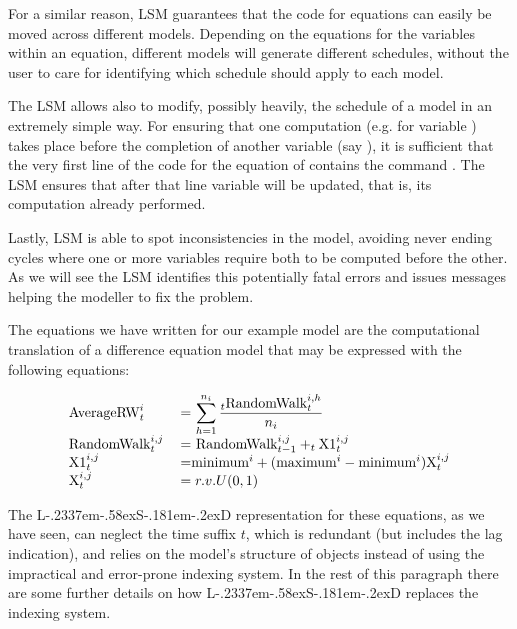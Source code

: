 \documentclass [11pt,a4paper] {book}
\def\LsD{{L\kern-.2337em\lower-.58ex\hbox{S}\kern-.181em\lower-.2ex\hbox{D}}\xspace}
\begin{document}
For a similar reason, LSM guarantees that the code for equations can easily be moved across different models. Depending on the equations for the variables within an equation, different models will generate different schedules, without the user to care for identifying which schedule should apply to each model.

The LSM allows also to modify, possibly heavily, the schedule of a model in an extremely simple way. For ensuring that one computation (e.g. for variable ) takes place before the completion of another variable (say ), it is sufficient that the very first line of the code for the equation of  contains the command . The LSM ensures that after that line variable  will be updated, that is, its computation already performed.

Lastly, LSM is able to spot inconsistencies in the model, avoiding never ending cycles where one or more variables require both to be computed before the other. As we will see the LSM identifies this potentially fatal errors and issues messages helping the modeller to fix the problem.


The equations we have written for our example model are the computational translation of a difference equation model that may be expressed with the following equations:

\begin{equation}
\begin{tabular}{ll}

$ \textnormal{AverageRW}_{t}^i$ & = $\displaystyle \sum_{h=1}^{n_i} \frac{_{t}\textnormal{RandomWalk}_t^{i,h}} {n_i} $\\
$ \textnormal{RandomWalk}_t^{i,j}$ & = $\textnormal{RandomWalk}_{t-1}^{i,j} + _{t}\textnormal{X1}_{t}^{i,j}$ \\
$\textnormal{X1}_t^{i,j} $& =$ \textnormal{minimum}^{i}+(\textnormal{maximum}^{i}-\textnormal{minimum}^{i})\textnormal{X}_{t}^{i,j} $\\
$ \textnormal{X}_{t}^{i,j} $& $ = r.v. U(0,1) $ \\
\end{tabular}
\end{equation}



The \LsD representation for these equations, as we have seen, can neglect the time suffix $t$, which is redundant (but includes the lag indication), and relies on the model's structure of objects instead of
using the impractical and error-prone indexing system. In the rest of this paragraph
there are some further details on how \LsD replaces the indexing system.
\end{document}
